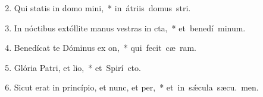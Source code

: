 \begin{flushleft}
\begin{enumerate}[leftmargin=*]
\setcounter{enumi}{1}

\item Qui statis in domo mini,~* \mbox{in átriis domus  stri.}
\item In nóctibus extóllite manus vestras in cta,~* \mbox{et benedí minum.}
\item Benedícat te Dóminus ex on,~* \mbox{qui fecit cæ  ram.}
\item Glória Patri, et lio,~* \mbox{et Spirí cto.}
\item Sicut erat in princípio, et nunc, et per,~* \mbox{et in s\'{\ae}cula sæcu. men.}

\end{enumerate}
\end{flushleft}

